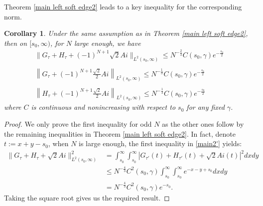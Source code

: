 \documentclass[11pt]{article}
\newtheorem{corollary}[theorem]{Corollary}
\numberwithin{equation}{section}%
\numberwithin{theorem}{section}
\begin{document}
Theorem \ref{main left soft edge2} leads to a key inequality for the corresponding norm.
\begin{corollary}\label{normAi}
Under the same assumption as in Theorem \ref{main left soft edge2}, then on $[s_0,\infty)$, for $N$ large enough, we have
   \begin{equation}\label{main3}
\begin{array}{ll}
  \|G_{\tau}+H_{\tau}+(-1)^{N+1}\sqrt2 Ai\|_{L^2(s_0,\infty)}\le N^{-\frac{2}{3}}C(s_0,\gamma)e^{-\frac{s_0}{2}}\\
  \\
  \left\|G_{\tau}+(-1)^{N+1}\frac{\sqrt2}{2} Ai\right\|_{L^2(s_0,\infty)}\le N^{-\frac{1}{3}}C(s_0,\gamma)e^{-\frac{s_0}{2}}\\
  \\
  \left\|H_{\tau}+(-1)^{N+1}\frac{\sqrt2}{2} Ai\right\|_{L^2(s_0,\infty)}\le N^{-\frac{1}{3}}C(s_0,\gamma)e^{-\frac{s_0}{2}}
\end{array}
\end{equation}
where $C$ is continuous and nonincreasing with respect to $s_0$ for any fixed $\gamma$.
\end{corollary}
\begin{proof}
    We only prove the first inequality for odd $N$ as the other ones follow by the remaining inequalities in Theorem \ref{main left soft edge2}. In fact, denote $t:=x+y-s_0$, when $N$ is large enough, the first inequality in \eqref{main2'} yields:
    \begin{equation*}
        \begin{split}
            \|G_{\tau}+H_{\tau}+\sqrt2 Ai\|^2_{L^2(s_0,\infty)}&=\int_{s_0}^\infty\int_{s_0}^\infty|G_{\tau'}(t)+H_{\tau'}(t)+\sqrt2Ai(t)|^2dxdy\\&\le N^{-\frac{4}{3}}C^2(s_0,\gamma)\int_{s_0}^\infty\int_{s_0}^\infty e^{-x-y+s_0}dxdy\\&=N^{-\frac{4}{3}}C^2(s_0,\gamma)e^{-s_0}.
        \end{split}
    \end{equation*}
    Taking the square root gives us the required result.
\end{proof}
\end{document}
